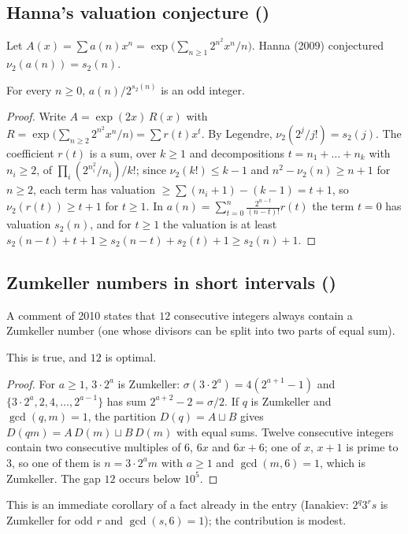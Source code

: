 \subsection{Hanna's valuation conjecture ()}\label{s:A155200}
Let $A(x)=\sum a(n)x^n=\exp\bigl(\sum_{n\ge1}2^{n^2}x^n/n\bigr)$. Hanna (2009) conjectured $\nu_2(a(n))=s_2(n)$.
\begin{theorem} For every $n\ge0$, $a(n)/2^{s_2(n)}$ is an odd integer.\end{theorem}
\begin{proof} Write $A=\exp(2x)\,R(x)$ with $R=\exp\bigl(\sum_{n\ge2}2^{n^2}x^n/n\bigr)=\sum r(t)x^t$. By Legendre,
$\nu_2(2^j/j!)=s_2(j)$. The coefficient $r(t)$ is a sum, over $k\ge1$ and decompositions $t=n_1+\dots+n_k$ with
$n_i\ge2$, of $\prod_i(2^{n_i^2}/n_i)/k!$; since $\nu_2(k!)\le k-1$ and $n^2-\nu_2(n)\ge n+1$ for $n\ge2$, each term has
valuation $\ge\sum(n_i+1)-(k-1)=t+1$, so $\nu_2(r(t))\ge t+1$ for $t\ge1$. In
$a(n)=\sum_{t=0}^n\frac{2^{n-t}}{(n-t)!}r(t)$ the term $t=0$ has valuation $s_2(n)$, and for $t\ge1$ the valuation is
at least $s_2(n-t)+t+1\ge s_2(n-t)+s_2(t)+1\ge s_2(n)+1$. \end{proof}

\subsection{Zumkeller numbers in short intervals ()}\label{s:A083207}
A comment of 2010 states that $12$ consecutive integers always contain a Zumkeller number (one whose divisors can
be split into two parts of equal sum).
\begin{proposition} This is true, and $12$ is optimal.\end{proposition}
\begin{proof} For $a\ge1$, $3\cdot2^a$ is Zumkeller: $\sigma(3\cdot2^a)=4(2^{a+1}-1)$ and
$\{3\cdot2^a,2,4,\dots,2^{a-1}\}$ has sum $2^{a+2}-2=\sigma/2$. If $q$ is Zumkeller and $\gcd(q,m)=1$, the partition
$D(q)=A\sqcup B$ gives $D(qm)=A\,D(m)\sqcup B\,D(m)$ with equal sums. Twelve consecutive integers contain two
consecutive multiples of $6$, $6x$ and $6x+6$; one of $x$, $x+1$ is prime to $3$, so one of them is $n=3\cdot2^am$ with
$a\ge1$ and $\gcd(m,6)=1$, which is Zumkeller. The gap $12$ occurs below $10^5$. \end{proof}
This is an immediate corollary of a fact already in the entry (Ianakiev: $2^q3^rs$ is Zumkeller for odd $r$ and
$\gcd(s,6)=1$); the contribution is modest.
